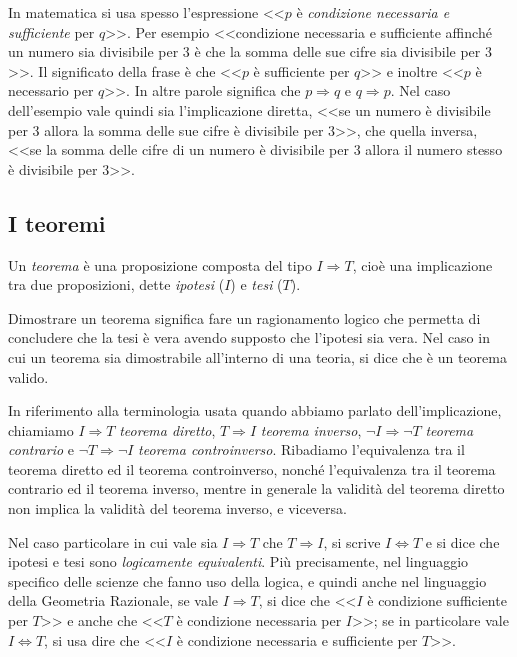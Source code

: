 In matematica si usa spesso l'espressione <<$p$ è \emph{condizione 
necessaria e sufficiente} per $q$>>. Per esempio <<condizione 
necessaria e sufficiente affinché un numero sia divisibile per $3$ è 
che la somma delle sue cifre sia divisibile per $3$>>. Il significato 
della frase è che <<$p$ è sufficiente per $q$>> e inoltre <<$p$ è 
necessario per $q$>>. In altre parole significa che  $p\Rightarrow q$ 
e $q\Rightarrow p$. Nel caso dell'esempio vale quindi sia 
l'implicazione diretta, <<se un numero è divisibile per $3$ allora la 
somma delle sue cifre è divisibile per $3$>>, che quella inversa, 
<<se la somma delle cifre di un numero è divisibile per $3$ allora il 
numero stesso è divisibile per $3$>>.

\vspazio\ovalbox{\risolvii \ref{ese:1.15}, \ref{ese:1.16}, 
\ref{ese:1.17}}

\subsection{I teoremi}

Un \emph{teorema} è una proposizione composta del tipo  $I\Rightarrow 
T$, cioè una implicazione tra due proposizioni, dette \emph{ipotesi} 
($I$) e \emph{tesi} ($T$).

Dimostrare un teorema significa fare un ragionamento logico che 
permetta di concludere che la tesi è vera avendo supposto che 
l'ipotesi sia vera. Nel caso in cui un teorema sia dimostrabile 
all'interno di una teoria, si dice che è un teorema valido.

In riferimento alla terminologia usata quando abbiamo parlato 
dell'implicazione, chiamiamo  $I\Rightarrow T$ \emph{teorema 
diretto}, $T\Rightarrow I$ \emph{teorema inverso}, $\neg I\Rightarrow 
\neg T$ \emph{teorema contrario} e $\neg T\Rightarrow \neg I$ 
\emph{teorema controinverso}. Ribadiamo l'equivalenza tra il teorema 
diretto ed il teorema controinverso, nonché l'equivalenza tra il 
teorema contrario ed il teorema inverso, mentre in generale la 
validità del teorema diretto non implica la validità del teorema 
inverso, e viceversa.

Nel caso particolare in cui vale sia $I\Rightarrow T$ che 
$T\Rightarrow I$, si scrive  $I\Leftrightarrow T$ e si dice che 
ipotesi e tesi sono \emph{logicamente equivalenti}. Più precisamente, 
nel linguaggio specifico delle scienze che fanno uso della logica, e 
quindi anche nel linguaggio della Geometria Razionale, se vale 
$I\Rightarrow T$, si dice che <<$I$ è condizione sufficiente per 
$T$>> e anche che <<$T$ è condizione necessaria per $I$>>; se in 
particolare vale  $I\Leftrightarrow T$, si usa dire che <<$I$ è 
condizione necessaria e sufficiente per $T$>>.

